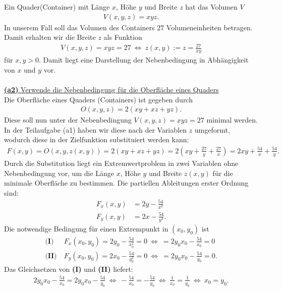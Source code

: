 Ein Quader(Container) mit Länge $ x $, Höhe $ y $ und Breite $ z $ hat das Volumen $ V $
\begin{align*}
	V(x,y,z) = xyz.
\end{align*}
In unserem Fall soll das Volumen des Containers $ 27 $ Volumeneinheiten betragen.
Damit erhalten wir die Breite $ z $ als Funktion
\begin{align*}
	V(x,y,z) = xyz = 27  
	\ \Leftrightarrow \
	z(x,y) := z = \frac{27}{xy}
\end{align*}
für $ x,y > 0 $. Damit liegt eine Darstellung der Nebenbedingung in Abhängigkeit von $x$ und $y$ vor.\\
\\
\underline{\textbf{(a2)} Verwende die Nebenbedingung für die Oberfläche eines Quaders}\\
Die Oberfläche eines Quaders (Containers) ist gegeben durch
\begin{align*}
	O(x,y,z) = 2 (xy + xz + yz).
\end{align*}
Diese soll nun unter der Nebenbedingung $V(x,y,z) = xyz = 27$ minimal werden. In der Teilaufgabe (a1) haben wir diese nach der Variablen $z$ umgeformt, wodurch diese in der Zielfunktion substituiert werden kann:
\begin{align*}
	F(x,y) = O(x,y,z(x,y))
	=
	2 ( xy +xz +yz )= 2 \left( xy + \frac{27}{y} + \frac{27}{x}\right)
	=
	2xy + \frac{54}{x} + \frac{54}{y}.
\end{align*}
Durch die Substitution liegt ein Extremwertproblem in zwei Variablen ohne Nebenbedingung vor, um die Länge $x$, Höhe $y$ und Breite $z(x,y)$ für die minimale Oberfläche zu bestimmen.
Die partiellen Ableitungen erster Ordnung sind:
\begin{align*}
	F_x(x,y) &= 2 y - \frac{54}{x^2}\\
	F_y(x,y) &= 2 x - \frac{54}{y^2}.
\end{align*}
Die notwendige Bedingung für einen Extrempunkt in $(x_0,y_0)$ ist
\begin{align*}
	\textbf{(I)} &\ F_x(x_0,y_0) = 2 y_0 - \frac{54}{x_0^2} = 0
	\ \Leftrightarrow \
	= 2 y_0 x_0- \frac{54}{x_0} = 0\\
	\textbf{(II)} &\ F_y(x_0,y_0) = 2 x_0 - \frac{54}{y_0^2} = 0
	\ \Leftrightarrow \
	= 2 y_0 x_0- \frac{54}{y_0} = 0.
\end{align*}
Das Gleichsetzen von \textbf{(I)} und \textbf{(II)} liefert:
\begin{align*}
	2 y_0 x_0- \frac{54}{x_0} = 2 y_0 x_0- \frac{54}{y_0}
	\ \Leftrightarrow \
	 -\frac{54}{x_0} = -\frac{54}{y_0}
	 \ \Leftrightarrow \
	 \frac{1}{x_0} = \frac{1}{y_0}
	 \ \Leftrightarrow \
	 x_0 = y_0.
\end{align*}
